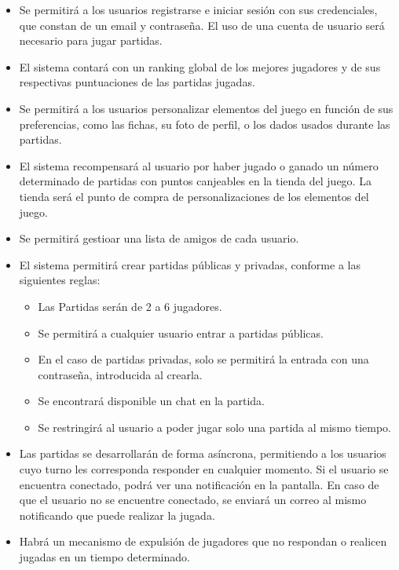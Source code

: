\documentclass[11pt, a4paper, titlepage]{article}
\begin{document}
\begin{itemize}
\item Se permitirá a los usuarios registrarse e iniciar sesión con sus credenciales, que constan de un email y contraseña. El uso de una cuenta de usuario será necesario para jugar partidas.

\item El sistema contará con un ranking global de los mejores jugadores y de sus respectivas puntuaciones de las partidas jugadas.

\item Se permitirá a los usuarios personalizar elementos del juego en función de sus preferencias, como las fichas, su foto de perfil, o los dados usados durante las partidas.

\item El sistema recompensará al usuario por haber jugado o ganado un número determinado de partidas con puntos canjeables en la tienda del juego. La tienda será el punto de compra de personalizaciones de los elementos del juego.

\item Se permitirá gestioar una lista de amigos de cada usuario.

\item El sistema permitirá crear partidas públicas y privadas, conforme a las siguientes reglas:
\begin{itemize}
    \item Las Partidas serán de 2 a 6 jugadores.
    \item Se permitirá a cualquier usuario entrar a partidas públicas.
    \item En el caso de partidas privadas, solo se permitirá la entrada con una contraseña, introducida al crearla.
    \item Se encontrará disponible un chat en la partida.
    \item Se restringirá al usuario a poder jugar solo una partida al mismo tiempo.
\end{itemize}

\item Las partidas se desarrollarán de forma asíncrona, permitiendo a los usuarios cuyo turno les corresponda responder en cualquier momento. Si el usuario se encuentra conectado, podrá ver una notificación en la pantalla. En caso de que el usuario no se encuentre conectado, se enviará un correo al mismo notificando que puede realizar la jugada.

\item Habrá un mecanismo de expulsión de jugadores que no respondan o realicen jugadas en un tiempo determinado.

\end{itemize}
\end{document}
